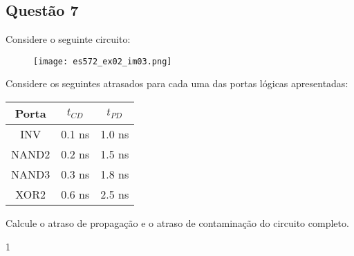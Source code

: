 \documentclass{article}
\begin{document}
\newpage
        \subsection{Questão 7}
            \begin{exercise}
                Considere o seguinte circuito:
                    \begin{figure}[H]
                        \centering
                        \texttt{[image: es572\_ex02\_im03.png]}
                    \end{figure} \noindent
                Considere os seguintes atrasados para cada uma das portas lógicas apresentadas:
                    \begin{table}[H]
                        \centering  
                        \begin{tabular}[]{c|cc}\hline
                            Porta & $t_{CD}$ & $t_{PD}$\\\hline
                            INV   & 0.1 ns   & 1.0 ns\\
                            NAND2 & 0.2 ns   & 1.5 ns\\
                            NAND3 & 0.3 ns   & 1.8 ns\\
                            XOR2  & 0.6 ns   & 2.5 ns\\\hline
                        \end{tabular}
                    \end{table}
                Calcule o atraso de propagação e o atraso de contaminação do circuito completo.
            \end{exercise}
            \begin{resolution}
                1
            \end{resolution}
\end{document}
